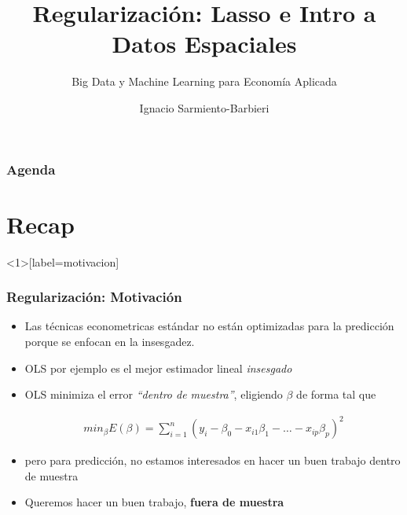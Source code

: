 \documentclass[
  shownotes,
  xcolor={svgnames},
  hyperref={colorlinks,citecolor=DarkBlue,linkcolor=andesred,urlcolor=DarkBlue}
  , aspectratio=169]{beamer}
\begin{document}
\title{Regularización: Lasso e Intro a Datos Espaciales}
\subtitle{Big Data y Machine Learning para Economía Aplicada}
\date{}

\author[Sarmiento-Barbieri]{Ignacio Sarmiento-Barbieri}



\begin{frame}[noframenumbering]
\maketitle
\end{frame}
\begin{frame}
\frametitle{Agenda}

\tableofcontents


\end{frame}
\section{Recap}
\begin{frame}<1>[label=motivacion]
\frametitle{Regularización: Motivación}

\begin{itemize}
\item Las técnicas econometricas estándar no están optimizadas para la predicción porque se enfocan en la insesgadez.
\medskip
\item OLS por ejemplo es el mejor estimador lineal {\it insesgado}
\medskip
\item OLS minimiza el error {\it ``dentro de muestra''}, eligiendo $\beta$ de forma tal que 


\begin{align}
min_{\beta} E(\beta) = \sum_{i=1}^n (y_i-\beta_0 - x_{i1}\beta_1 - \dots - x_{ip}\beta_p)^2 
\end{align}

\item pero para predicción, no estamos interesados en hacer un buen trabajo dentro de muestra 
\medskip
\item Queremos hacer un buen trabajo, {\bf fuera de muestra}
\end{itemize}
\end{frame}
\end{document}
